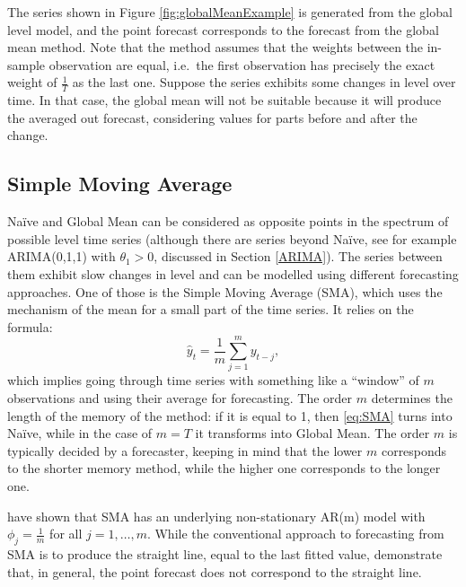 \documentclass[]{book}
\theoremstyle{definition}
\theoremstyle{definition}
\theoremstyle{definition}
\theoremstyle{definition}
\theoremstyle{remark}
\begin{document}
The series shown in Figure \ref{fig:globalMeanExample} is generated from the global level model, and the point forecast corresponds to the forecast from the global mean method. Note that the method assumes that the weights between the in-sample observation are equal, i.e.~the first observation has precisely the exact weight of \(\frac{1}{T}\) as the last one. Suppose the series exhibits some changes in level over time. In that case, the global mean will not be suitable because it will produce the averaged out forecast, considering values for parts before and after the change.

\hypertarget{SMA}{%
\subsection{Simple Moving Average}\label{SMA}}

Naïve and Global Mean can be considered as opposite points in the spectrum of possible level time series (although there are series beyond Naïve, see for example ARIMA(0,1,1) with \(\theta_1>0\), discussed in Section \ref{ARIMA}). The series between them exhibit slow changes in level and can be modelled using different forecasting approaches. One of those is the Simple Moving Average (SMA), which uses the mechanism of the mean for a small part of the time series. It relies on the formula:
\begin{equation}
    \hat{y}_t = \frac{1}{m}\sum_{j=1}^{m} y_{t-j},
    \label{eq:SMA}
\end{equation}
which implies going through time series with something like a ``window'' of \(m\) observations and using their average for forecasting. The order \(m\) determines the length of the memory of the method: if it is equal to 1, then \eqref{eq:SMA} turns into Naïve, while in the case of \(m=T\) it transforms into Global Mean. The order \(m\) is typically decided by a forecaster, keeping in mind that the lower \(m\) corresponds to the shorter memory method, while the higher one corresponds to the longer one.

\citet{Svetunkov2017} have shown that SMA has an underlying non-stationary AR(m) model with \(\phi_j=\frac{1}{m}\) for all \(j=1, \dots, m\). While the conventional approach to forecasting from SMA is to produce the straight line, equal to the last fitted value, \citet{Svetunkov2017} demonstrate that, in general, the point forecast does not correspond to the straight line.
\end{document}
